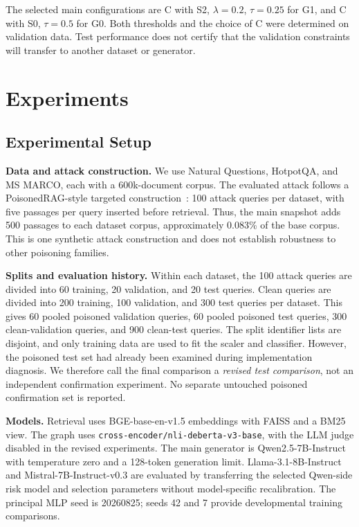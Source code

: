 \documentclass[sigconf]{acmart}
\begin{document}
The selected main configurations are C with S2, $\lambda=0.2$, $\tau=0.25$ for G1, and C with S0, $\tau=0.5$ for G0. Both thresholds and the choice of C were determined on validation data. Test performance does not certify that the validation constraints will transfer to another dataset or generator.

\section{Experiments}

\subsection{Experimental Setup}

\textbf{Data and attack construction.} We use Natural Questions, HotpotQA, and MS MARCO, each with a 600k-document corpus. The evaluated attack follows a PoisonedRAG-style targeted construction~\cite{zou2024poisonedrag}: 100 attack queries per dataset, with five passages per query inserted before retrieval. Thus, the main snapshot adds 500 passages to each dataset corpus, approximately 0.083\% of the base corpus. This is one synthetic attack construction and does not establish robustness to other poisoning families.

\textbf{Splits and evaluation history.} Within each dataset, the 100 attack queries are divided into 60 training, 20 validation, and 20 test queries. Clean queries are divided into 200 training, 100 validation, and 300 test queries per dataset. This gives 60 pooled poisoned validation queries, 60 pooled poisoned test queries, 300 clean-validation queries, and 900 clean-test queries. The split identifier lists are disjoint, and only training data are used to fit the scaler and classifier. However, the poisoned test set had already been examined during implementation diagnosis. We therefore call the final comparison a \emph{revised test comparison}, not an independent confirmation experiment. No separate untouched poisoned confirmation set is reported.

\textbf{Models.} Retrieval uses BGE-base-en-v1.5 embeddings with FAISS and a BM25 view. The graph uses \texttt{cross-encoder/nli-deberta-v3-base}, with the LLM judge disabled in the revised experiments. The main generator is Qwen2.5-7B-Instruct with temperature zero and a 128-token generation limit. Llama-3.1-8B-Instruct and Mistral-7B-Instruct-v0.3 are evaluated by transferring the selected Qwen-side risk model and selection parameters without model-specific recalibration. The principal MLP seed is 20260825; seeds 42 and 7 provide developmental training comparisons.
\end{document}
